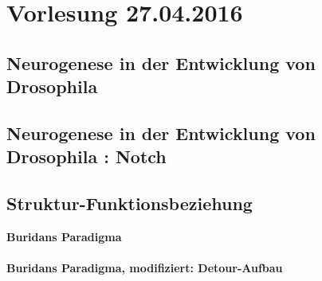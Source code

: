 \section{Vorlesung 27.04.2016}

\subsection{Neurogenese in der Entwicklung von Drosophila}

\subsection{Neurogenese in der Entwicklung von Drosophila : Notch}

\subsection{Struktur-Funktionsbeziehung}

\textbf{Buridans Paradigma}
\\\\
\textbf{Buridans Paradigma, modifiziert: Detour-Aufbau}